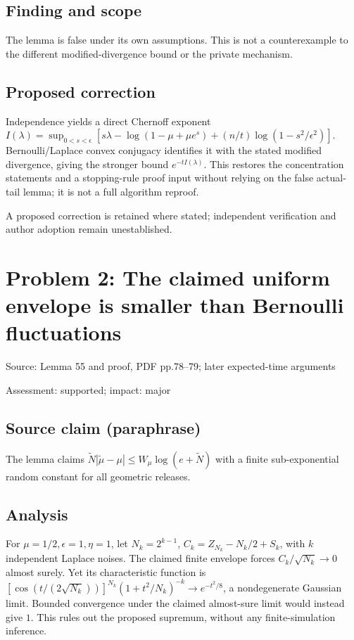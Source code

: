 \documentclass[11pt]{article}
\begin{document}
\subsection*{Finding and scope}

The lemma is false under its own assumptions. This is not a counterexample to the different modified-divergence bound or the private mechanism.

\subsection*{Proposed correction}

Independence yields a direct Chernoff exponent \(I(\lambda)=\sup_{0<s<\epsilon}[s\lambda-\log(1-\mu+\mu e^s)+(n/t)\log(1-s^2/\epsilon^2)]\). Bernoulli/Laplace convex conjugacy identifies it with the stated modified divergence, giving the stronger bound \(e^{-tI(\lambda)}\). This restores the concentration statements and a stopping-rule proof input without relying on the false actual-tail lemma; it is not a full algorithm reproof.

A proposed correction is retained where stated; independent verification and author adoption remain unestablished.

\section*{Problem 2: The claimed uniform envelope is smaller than Bernoulli fluctuations}

Source: Lemma 55 and proof, PDF pp.78–79; later expected-time arguments

Assessment: supported; impact: major

\subsection*{Source claim (paraphrase)}

The lemma claims \(\widetilde N|\widetilde\mu-\mu|\le W_\mu\log(e+\widetilde N)\) with a finite sub-exponential random constant for all geometric releases.

\subsection*{Analysis}

For \(\mu=1/2,\epsilon=1,\eta=1\), let \(N_k=2^{k-1}\), \(C_k=Z_{N_k}-N_k/2+S_k\), with \(k\) independent Laplace noises. The claimed finite envelope forces \(C_k/\sqrt{N_k}\to0\) almost surely. Yet its characteristic function is \([\cos(t/(2\sqrt{N_k}))]^{N_k}(1+t^2/N_k)^{-k}\to e^{-t^2/8}\), a nondegenerate Gaussian limit. Bounded convergence under the claimed almost-sure limit would instead give \(1\). This rules out the proposed supremum, without any finite-simulation inference.
\end{document}
